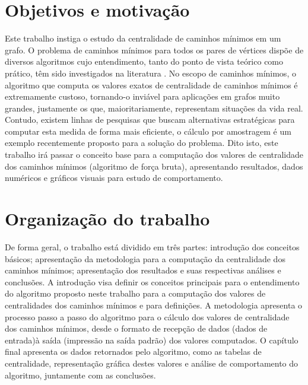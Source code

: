 \section{Objetivos e motivação}
Este trabalho instiga o estudo da centralidade de caminhos mínimos em um grafo. O problema de caminhos mínimos para todos os pares de vértices dispõe de diversos algoritmos cujo entendimento, tanto do ponto de vista teórico como prático, têm sido investigados na literatura \cite{williams2014} \cite{pettie2002}. No escopo de caminhos mínimos, o algoritmo que computa os valores exatos de centralidade de caminhos mínimos é extremamente custoso, tornando-o inviável para aplicações em grafos muito grandes, justamente os que, maioritariamente, representam situações da vida real. Contudo, existem linhas de pesquisas que buscam alternativas estratégicas para computar esta medida de forma mais eficiente, o cálculo por amostragem \cite{alane2021} é um exemplo recentemente proposto para a solução do problema. Dito isto, este trabalho irá passar o conceito base para a computação dos valores de centralidade dos caminhos mínimos (algoritmo de força bruta), apresentando resultados, dados numéricos e gráficos visuais para estudo de comportamento.

\section{Organização do trabalho}
De forma geral, o trabalho está dividido em três partes: introdução dos conceitos básicos; apresentação da metodologia para a computação da centralidade dos caminhos mínimos; apresentação dos resultados e suas respectivas análises e conclusões. A introdução visa definir os conceitos principais para o entendimento do algoritmo proposto neste trabalho para a computação dos valores de centralidades dos caminhos mínimos e para definições. A metodologia apresenta o processo passo a passo do algoritmo para o cálculo dos valores de centralidade dos caminhos mínimos, desde o formato de recepção de dados (dados de entrada)à saída (impressão na saída padrão) dos valores computados. O capítulo final apresenta os dados retornados pelo algoritmo, como as tabelas de centralidade, representação gráfica destes valores e análise de comportamento do algoritmo, juntamente com as conclusões.